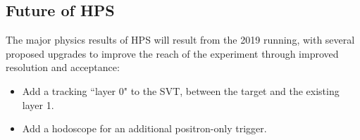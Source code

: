 \documentclass[b1]{sciposter}
\begin{document}
\begin{multicols}{3}
        \section*{Future of HPS}
%

        The major physics results of HPS will result from the 2019 running, %
        with several proposed upgrades to improve the reach of the experiment through improved resolution and acceptance:  
        \begin{small}
     	\begin{itemize}
	\item Add a tracking ``layer 0" to the SVT,  between the target and the existing layer 1.  
	\item Add a hodoscope for an additional positron-only trigger.  
	\end{itemize}
	\end{small}
\end{multicols}
\end{document}
